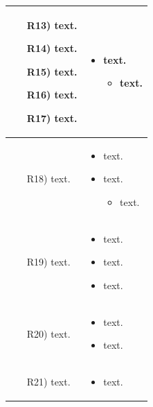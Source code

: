 \documentclass[table, 12pt]{article}
\begin{document}
\begin{longtable}{|p{}|p{}|}
    \begin{itemize}
        \item[R13)] text.
        \item[R14)] text.
        \item[R15)] text. 
        \item[R16)] text.
        \item[R17)] text. 
    \end{itemize}

    &
    \begin{itemize}
        \item text. \begin{itemize}
            \item text.
        \end{itemize}
    \end{itemize}
    \\\hline

    \begin{itemize}
        \item[R18)] text.
    \end{itemize}
    &
    \begin{itemize}
        \item text. 
        \item text.
        \begin{itemize}
            \item text.
        \end{itemize}
    \end{itemize}
    \\\hline

    \begin{itemize}
        \item[R19)] text.
    \end{itemize}
    &
    \begin{itemize}
        \item text.
        \item text.
        \item text.
    \end{itemize}
    \\\hline

    \begin{itemize}
        \item[R20)] text. 
    \end{itemize}
    &
    \begin{itemize}
        \item text.
        \item text.
    \end{itemize}
    \\\hline
    \begin{itemize}
        \item[R21)] text.
    \end{itemize}
    &
    \begin{itemize}
        \item text.
    \end{itemize}\\\hline
\end{longtable}
\end{document}
